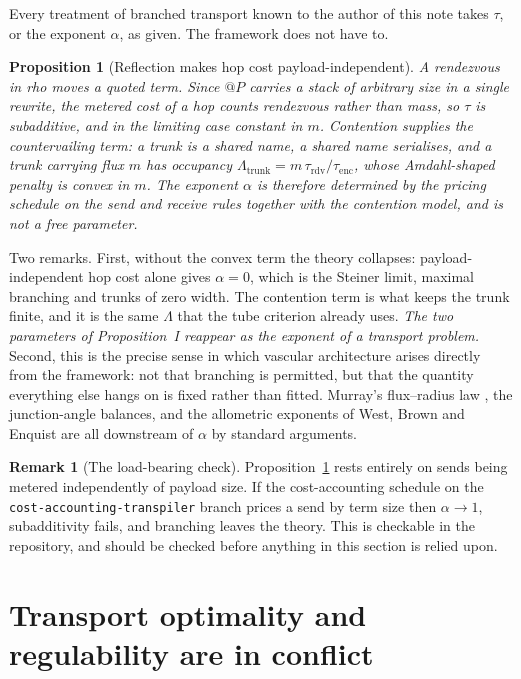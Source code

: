 \documentclass[11pt]{article}
\theoremstyle{plain}
\newtheorem{proposition}[theorem]{Proposition}
\theoremstyle{definition}
\newtheorem{remark}[theorem]{Remark}
\newcommand{\rhoc}{\textsf{rho}}
\begin{document}
Every treatment of branched transport known to the author of this note takes $\tau$, or the exponent
$\alpha$, as given. The framework does not have to.

\begin{proposition}[Reflection makes hop cost payload-independent]
\label{prop:N}
A rendezvous in \rhoc{} moves a quoted term. Since $@P$ carries a stack of arbitrary size in a single
rewrite, the metered cost of a hop counts rendezvous rather than mass, so $\tau$ is subadditive, and
in the limiting case constant in $m$. Contention supplies the countervailing term: a trunk is a
shared name, a shared name serialises, and a trunk carrying flux $m$ has occupancy
$\Lambda_{\mathrm{trunk}} = m\,\tau_{\mathrm{rdv}} / \tau_{\mathrm{enc}}$, whose Amdahl-shaped penalty
is convex in $m$. The exponent $\alpha$ is therefore determined by the pricing schedule on the send
and receive rules together with the contention model, and is not a free parameter.
\end{proposition}

Two remarks. First, without the convex term the theory collapses: payload-independent hop cost alone
gives $\alpha = 0$, which is the Steiner limit, maximal branching and trunks of zero width. The
contention term is what keeps the trunk finite, and it is the same $\Lambda$ that the tube criterion
already uses. \emph{The two parameters of Proposition~I reappear as the exponent of a transport
problem.} Second, this is the precise sense in which vascular architecture arises directly from the
framework: not that branching is permitted, but that the quantity everything else hangs on is fixed
rather than fitted. Murray's flux--radius law \cite{murray1926}, the junction-angle balances, and the
allometric exponents of West, Brown and Enquist \cite{wbe1997} are all downstream of $\alpha$ by
standard arguments.

\begin{remark}[The load-bearing check]
\label{rem:check}
Proposition~\ref{prop:N} rests entirely on sends being metered independently of payload size. If the
cost-accounting schedule on the \texttt{cost-accounting-transpiler} branch prices a send by term
size then $\alpha \to 1$, subadditivity fails, and branching leaves the theory. This is checkable in the
repository, and should be checked before anything in this section is relied upon.
\end{remark}

\section{Transport optimality and regulability are in conflict}
\label{sec:conflict}
\end{document}
